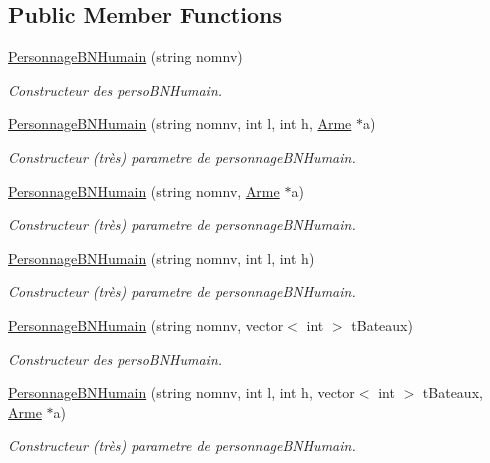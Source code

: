 \subsection*{Public Member Functions}
\begin{DoxyCompactItemize}
\item 
\hyperlink{classPersonnageBNHumain_a5d6c647bf6993595f2df0f557696a4f0}{Personnage\-B\-N\-Humain} (string nomnv)
\begin{DoxyCompactList}\small\item\em Constructeur des perso\-B\-N\-Humain. \end{DoxyCompactList}\item 
\hyperlink{classPersonnageBNHumain_a665cc1cafbcfda21103442ab8405c8d4}{Personnage\-B\-N\-Humain} (string nomnv, int l, int h, \hyperlink{classArme}{Arme} $\ast$a)
\begin{DoxyCompactList}\small\item\em Constructeur (très) parametre de personnage\-B\-N\-Humain. \end{DoxyCompactList}\item 
\hyperlink{classPersonnageBNHumain_a01247437df040f343c1ab9570e857664}{Personnage\-B\-N\-Humain} (string nomnv, \hyperlink{classArme}{Arme} $\ast$a)
\begin{DoxyCompactList}\small\item\em Constructeur (très) parametre de personnage\-B\-N\-Humain. \end{DoxyCompactList}\item 
\hyperlink{classPersonnageBNHumain_accecdded5770352d48561e6da60cf886}{Personnage\-B\-N\-Humain} (string nomnv, int l, int h)
\begin{DoxyCompactList}\small\item\em Constructeur (très) parametre de personnage\-B\-N\-Humain. \end{DoxyCompactList}\item 
\hyperlink{classPersonnageBNHumain_a489f81be78156eb0cf0493a78d3545d8}{Personnage\-B\-N\-Humain} (string nomnv, vector$<$ int $>$ t\-Bateaux)
\begin{DoxyCompactList}\small\item\em Constructeur des perso\-B\-N\-Humain. \end{DoxyCompactList}\item 
\hyperlink{classPersonnageBNHumain_aacdcaed63e62521aeed7aadfdf8b0e7d}{Personnage\-B\-N\-Humain} (string nomnv, int l, int h, vector$<$ int $>$ t\-Bateaux, \hyperlink{classArme}{Arme} $\ast$a)
\begin{DoxyCompactList}\small\item\em Constructeur (très) parametre de personnage\-B\-N\-Humain. \end{DoxyCompactList}\item 

\end{DoxyCompactItemize}
